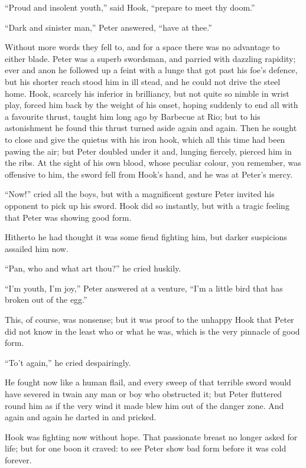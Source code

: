 ``Proud and insolent youth,'' said Hook, ``prepare to meet thy doom.''

``Dark and sinister man,'' Peter answered, ``have at thee.''

Without more words they fell to, and for a space there was no advantage
to either blade. Peter was a superb swordsman, and parried with
dazzling rapidity; ever and anon he followed up a feint with a lunge
that got past his foe's defence, but his shorter reach stood him in ill
stead, and he could not drive the steel home. Hook, scarcely his
inferior in brilliancy, but not quite so nimble in wrist play, forced
him back by the weight of his onset, hoping suddenly to end all with a
favourite thrust, taught him long ago by Barbecue at Rio; but to his
astonishment he found this thrust turned aside again and again. Then he
sought to close and give the quietus with his iron hook, which all this
time had been pawing the air; but Peter doubled under it and, lunging
fiercely, pierced him in the ribs. At the sight of his own blood, whose
peculiar colour, you remember, was offensive to him, the sword fell
from Hook's hand, and he was at Peter's mercy.

``Now!'' cried all the boys, but with a magnificent gesture Peter invited
his opponent to pick up his sword. Hook did so instantly, but with a
tragic feeling that Peter was showing good form.

Hitherto he had thought it was some fiend fighting him, but darker
suspicions assailed him now.

``Pan, who and what art thou?'' he cried huskily.

``I'm youth, I'm joy,'' Peter answered at a venture, ``I'm a little bird
that has broken out of the egg.''

This, of course, was nonsense; but it was proof to the unhappy Hook
that Peter did not know in the least who or what he was, which is the
very pinnacle of good form.

``To't again,'' he cried despairingly.

He fought now like a human flail, and every sweep of that terrible
sword would have severed in twain any man or boy who obstructed it; but
Peter fluttered round him as if the very wind it made blew him out of
the danger zone. And again and again he darted in and pricked.

Hook was fighting now without hope. That passionate breast no longer
asked for life; but for one boon it craved: to see Peter show bad form
before it was cold forever.

